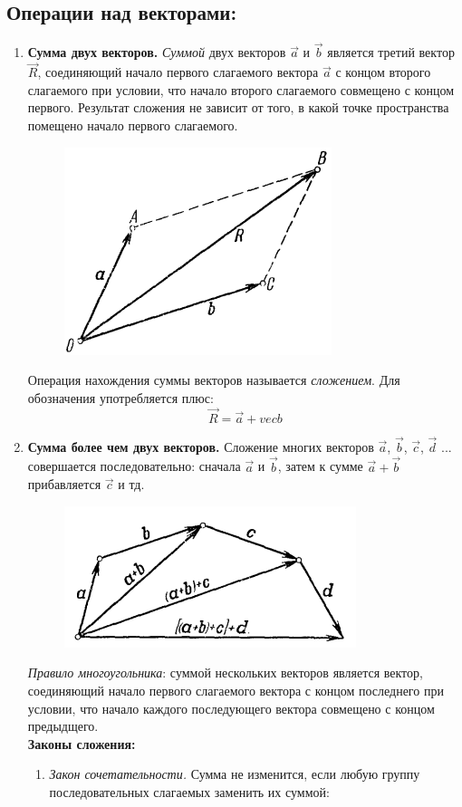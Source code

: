 \documentclass{article}
\begin{document}
\subsection{Операции над векторами:}
\begin{enumerate}
  \item \textbf{Сумма двух векторов.} \textit{Суммой} двух векторов $\vec{a}$ и $\vec{b}$ является третий вектор $\vec{R}$, соединяющий начало первого слагаемого вектора $\vec{a}$ с концом второго слагаемого при условии, что начало второго слагаемого совмещено с концом первого. Результат сложения не зависит от того, в какой точке пространства помещено начало первого слагаемого.
  \begin{figure} [H]
      \centering
      \includegraphics[width=0.3\linewidth]{image1_6.png}
  \end{figure}
  Операция нахождения суммы векторов называется \textit{сложением}. Для обозначения употребляется плюс:
  $$\vec{R} = \vec{a} + vec{b}$$
  \item \textbf{Сумма более чем двух векторов.} Сложение многих векторов $\vec{a}$, $\vec{b}$, $\vec{c}$, $\vec{d}$ ... совершается последовательно: сначала $\vec{a}$ и $\vec{b}$, затем к сумме $\vec{a} + \vec{b}$ прибавляется $\vec{c}$ и тд.
  \begin{figure} [H]
      \centering
      \includegraphics[width=0.3\linewidth]{image1_5.png}
  \end{figure}
  \textit{Правило многоугольника}: суммой нескольких векторов является вектор, соединяющий начало первого слагаемого вектора с концом последнего при условии, что начало каждого последующего вектора совмещено с концом предыдщего.\\ 
  \textbf{Законы сложения:}
    \begin{enumerate}
        \item \textit{Закон сочетательности.} Сумма не изменится, если любую группу последовательных слагаемых заменить их суммой:

\end{enumerate}
\end{enumerate}
\end{document}
